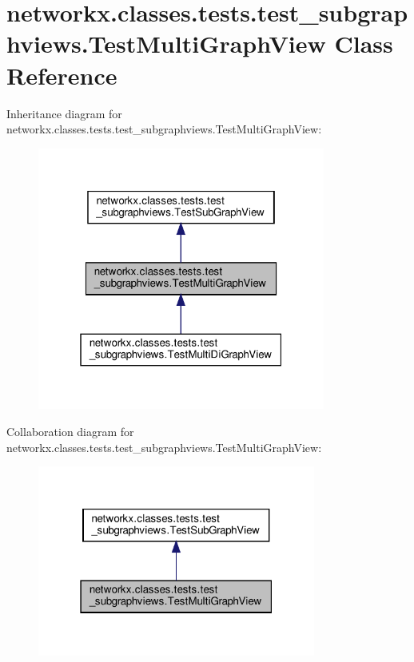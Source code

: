 \hypertarget{classnetworkx_1_1classes_1_1tests_1_1test__subgraphviews_1_1TestMultiGraphView}{}\section{networkx.\+classes.\+tests.\+test\+\_\+subgraphviews.\+Test\+Multi\+Graph\+View Class Reference}
\label{classnetworkx_1_1classes_1_1tests_1_1test__subgraphviews_1_1TestMultiGraphView}


Inheritance diagram for networkx.\+classes.\+tests.\+test\+\_\+subgraphviews.\+Test\+Multi\+Graph\+View\+:
\nopagebreak
\begin{figure}[H]
\begin{center}
\leavevmode
\includegraphics[width=268pt]{classnetworkx_1_1classes_1_1tests_1_1test__subgraphviews_1_1TestMultiGraphView__inherit__graph}
\end{center}
\end{figure}


Collaboration diagram for networkx.\+classes.\+tests.\+test\+\_\+subgraphviews.\+Test\+Multi\+Graph\+View\+:
\nopagebreak
\begin{figure}[H]
\begin{center}
\leavevmode
\includegraphics[width=259pt]{classnetworkx_1_1classes_1_1tests_1_1test__subgraphviews_1_1TestMultiGraphView__coll__graph}
\end{center}
\end{figure}
